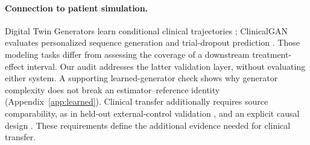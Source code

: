 \paragraph{Connection to patient simulation.}
Digital Twin Generators learn conditional clinical trajectories
\citep{alam2024}; ClinicalGAN evaluates personalized sequence generation
and trial-dropout prediction \citep{chandra2024}. Those modeling tasks differ
from assessing the coverage of a downstream treatment-effect interval.
Our audit addresses the latter validation layer, without evaluating either
system. A supporting learned-generator check shows why generator complexity
does not break an estimator--reference identity (Appendix~\ref{app:learned}).
Clinical transfer additionally requires source comparability, as in held-out
external-control validation \citep{ventz2019}, and an explicit causal design
\citep{hernan2016,schuler2022}. These requirements define the additional evidence needed for clinical transfer.
